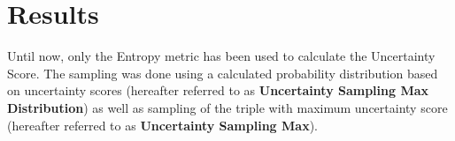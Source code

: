 \section{Results}

Until now, only the Entropy metric has been used to calculate the Uncertainty Score.
The sampling was done using a calculated probability distribution based on uncertainty scores (hereafter referred to as \textbf{Uncertainty Sampling Max Distribution}) as well as sampling of the triple with maximum uncertainty score (hereafter referred to as \textbf{Uncertainty Sampling Max}).



\newpage



\newpage







